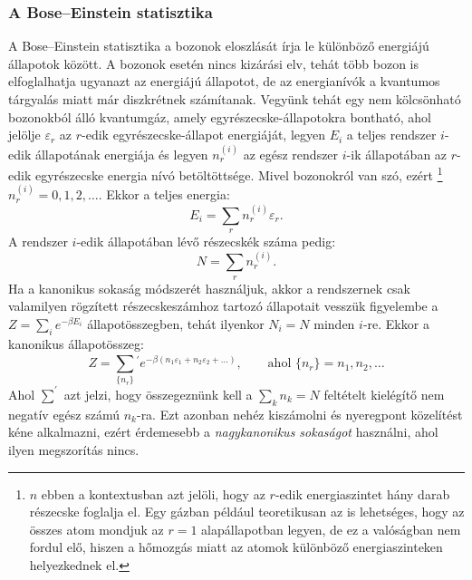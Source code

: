 \documentclass[../main.tex]{subfiles}
\begin{document}
\subsubsection{A Bose–Einstein statisztika}
A Bose–Einstein statisztika a bozonok eloszlását írja le különböző energiájú állapotok között. A bozonok esetén nincs kizárási elv, tehát több bozon is elfoglalhatja ugyanazt az energiájú állapotot,
de az energianívók a kvantumos tárgyalás miatt már diszkrétnek számítanak. Vegyünk tehát egy nem kölcsönható bozonokból álló kvantumgáz, amely egyrészecske-állapotokra bontható, ahol jelölje $\varepsilon_r$ az $r$-edik egyrészecske-állapot energiáját,
legyen $E_i$ a teljes rendszer $i$-edik állapotának energiája és legyen $n^{(i)}_r$ az egész rendszer $i$-ik állapotában az $r$-edik egyrészecske energia nívó betöltöttsége. Mivel bozonokról van szó,
ezért
\footnote{
    $n$ ebben a kontextusban azt jelöli, hogy az $r$-edik energiaszintet hány darab részecske foglalja el. Egy gázban például teoretikusan az is lehetséges, hogy az összes atom mondjuk az $r=1$ alapállapotban legyen,
    de ez a valóságban nem fordul elő, hiszen a hőmozgás miatt az atomok különböző energiaszinteken helyezkednek el.                                            
}
$n^{(i)}_r = 0, 1, 2, \ldots$. Ekkor a teljes energia:
\begin{equation}
    E_i = \sum_r n^{(i)}_r \varepsilon_r.
\end{equation}
A rendszer $i$-edik állapotában lévő részecskék száma pedig:
\begin{equation}
    N = \sum_r n^{(i)}_r.
\end{equation}  
Ha a kanonikus sokaság módszerét használjuk, akkor a rendszernek csak valamilyen rögzített részecskeszámhoz tartozó állapotait vesszük figyelembe a $Z = \sum_i e^{-\beta E_i}$ állapotösszegben,
tehát ilyenkor $N_i = N$ minden $i$-re. Ekkor a kanonikus állapotösszeg:
\begin{equation}
    Z = \sum_{\{n_r\}}^{}{}^{'} e^{-\beta (n_1 \varepsilon_1 + n_2 \varepsilon_2 + \ldots)}, \qquad \text{ahol } \{n_r\} = n_1, n_2, \ldots
\end{equation}
Ahol $\sum^{'}$ azt jelzi, hogy összegeznünk kell a $\sum_k n_k = N$ feltételt kielégítő nem negatív egész számú $n_k$-ra. Ezt azonban nehéz kiszámolni és nyeregpont közelítést kéne alkalmazni,
ezért érdemesebb a \textit{nagykanonikus sokaságot} használni, ahol ilyen megszorítás nincs.
\end{document}
